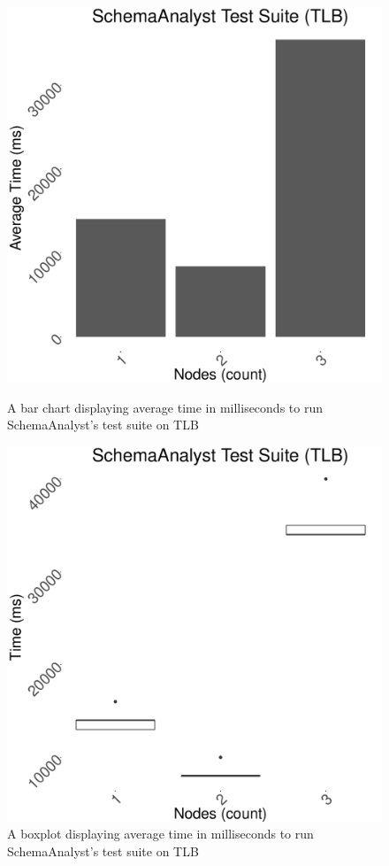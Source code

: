 \documentclass{article}
\begin{document}
{\begin{figure}[!ht]
  \centering
  \begin{minipage}[b]{0.4\textwidth}
    \includegraphics[width=\textwidth]{../data/graphs/sa_bar_tlb.pdf}
    \caption{A bar chart displaying average time in milliseconds to run SchemaAnalyst's test suite on TLB}
    \label{sabar}
  \end{minipage}
  \hfill
  \begin{minipage}[b]{0.4\textwidth}
    \includegraphics[width=\textwidth]{../data/graphs/sa_boxplot_tlb.pdf}
    \caption{A boxplot displaying average time in milliseconds to run SchemaAnalyst's test suite on TLB}
    \label{sabox}
  \end{minipage}
\end{figure}

}
\end{document}
